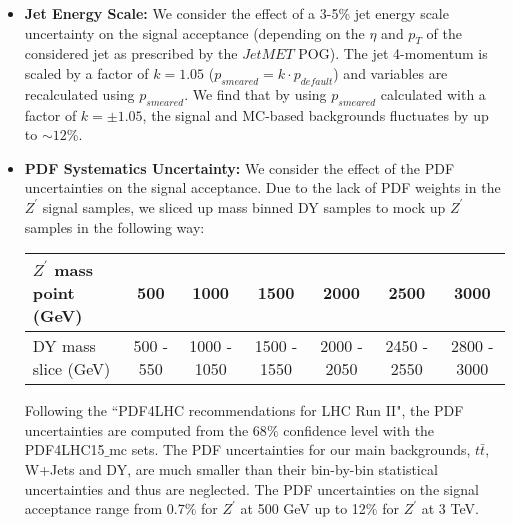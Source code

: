 \begin{itemize}
  \item \textbf{Jet Energy Scale:} We consider the effect of a 3-5\% jet energy scale uncertainty on the signal 
acceptance (depending on the $\eta$ and $p_{T}$ of the considered jet as prescribed by the $JetMET$ POG). The jet 
4-momentum is scaled by a factor of $k=1.05$ ($p_{smeared} = k \cdot p_{default}$) and variables are recalculated 
using $p_{smeared}$. We find that by using $p_{smeared}$ calculated with
a factor of $k=\pm 1.05$, the signal and MC-based backgrounds fluctuates by up to $\sim 12$\%. 
%

  \item \textbf{PDF Systematics Uncertainty:} We consider the effect of the PDF uncertainties on the signal acceptance. 
Due to the lack of PDF weights in the $Z^\prime$ signal samples, we sliced up mass binned DY samples to mock up $Z^\prime$ samples in 
the following way:
\begin{table}[htbp!]	
  \begin{tabular}{| l | c | c | c | c | c | c |} 
  \hline\hline 
  $Z^\prime$ mass point (GeV) & 500 & 1000 & 1500 & 2000 & 2500 & 3000\\
  \hline
  DY mass slice (GeV) & 500 - 550 & 1000 - 1050 & 1500 - 1550 & 2000 - 2050 & 2450 - 2550 & 2800 - 3000\\
  \hline \hline
  \end{tabular}
\end{table}

Following the ``PDF4LHC recommendations for LHC Run
II"\cite{PDF4LHC15}, the PDF uncertainties are computed from the
68$\%$ confidence level with the PDF4LHC15$\_$mc sets. The PDF
uncertainties for our main backgrounds, $t\bar{t}$, W+Jets and DY, are
much smaller than their bin-by-bin statistical uncertainties and thus are
neglected. The PDF uncertainties on the signal acceptance range from
0.7$\%$ for $Z^\prime$ at 500 GeV up to 12$\%$ for $Z^\prime$ at 3 TeV.



\end{itemize}
